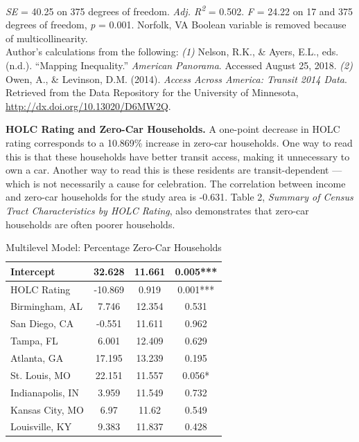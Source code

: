 \documentclass[paper=letter, fontsize=12pt]{scrartcl} %
\begin{document}
\begin{table}
\textit{SE} = 40.25 on 375 degrees of freedom. \textit{Adj. R\textsuperscript{2}} = 0.502. \textit{F} = 24.22 on 17 and 375 degrees of freedom, \textit{p} = 0.001. Norfolk, VA Boolean variable is removed because of multicollinearity.\\
Author's calculations from the following: \textit{(1)} Nelson, R.K., \& Ayers, E.L., eds. (n.d.). ``Mapping Inequality.'' \textit{American Panorama}. Accessed August 25, 2018. \textit{(2)} Owen, A., \& Levinson, D.M. (2014). \textit{Access Across America: Transit 2014 Data}. Retrieved from the Data Repository for the University of Minnesota, \href{http://dx.doi.org/10.13020/D6MW2Q}{http://dx.doi.org/10.13020/D6MW2Q}.
\end{table}

\begin{table}
	\textbf{HOLC Rating and Zero-Car Households.} A one-point decrease in HOLC rating corresponds to a 10.869\% increase in zero-car households. One way to read this is that these households have better transit access, making it unnecessary to own a car. Another way to read this is these residents are transit-dependent --- which is not necessarily a cause for celebration. The correlation between income and zero-car households for the study area is -0.631. Table 2, \textit{Summary of Census Tract Characteristics by HOLC Rating}, also demonstrates that zero-car households are often poorer households.
	\caption{Multilevel Model: Percentage Zero-Car Households}
	\begin{center}
		\begin{tabular}{|| l | c c c ||}
			\hline
			Intercept & 32.628 & 11.661 & 0.005***\\ 
			\hline 
			HOLC Rating & -10.869 & 0.919 & 0.001***\\ 
			\hline 
			Birmingham, AL & 7.746 & 12.354 & 0.531\\ 
			\hline 
			San Diego, CA & -0.551 & 11.611 & 0.962\\ 
			\hline 
			Tampa, FL & 6.001 & 12.409 & 0.629\\ 
			\hline 
			Atlanta, GA & 17.195 & 13.239 & 0.195\\ 
			\hline 
			St. Louis, MO & 22.151 & 11.557 & 0.056*\\ 
			\hline 
			Indianapolis, IN & 3.959 & 11.549 & 0.732\\ 
			\hline 
			Kansas City, MO & 6.97 & 11.62 & 0.549\\ 
			\hline 
			Louisville, KY & 9.383 & 11.837 & 0.428\\ 

\end{tabular}
\end{center}
\end{table}
\end{document}
